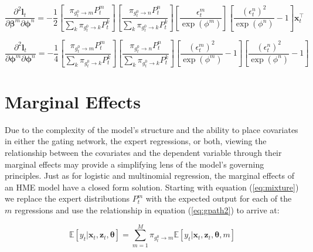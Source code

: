 \documentclass[12pt]{article}
\newcommand{\gateprod}[2]{\pi_{#1 \longrightarrow #2}}
\theoremstyle{definition}
\begin{document}
\begin{equation} 
  \frac{\partial^{2} \boldsymbol{l}_{t}}{\partial \boldsymbol{\beta}^{m} \partial \boldsymbol{\phi}^{n} } = - \frac{1}{2}  \left[ \frac{\gateprod{g^{0}_{t}}{m} P^{m}_{t}}{ \sum_{k} \gateprod{g^{0}_{t}}{k} P^{k}_{t}} \right] \left[ \frac{\gateprod{g^{0}_{t}}{n} P^{n}_{t}}{ \sum_{k} \gateprod{g^{0}_{t}}{k} P^{k}_{t}} \right]  \left[ \frac{\epsilon^{m}_{t}}{\exp(\phi^{m})} \right] \left[  \frac{ (\epsilon^{n}_{t})^{2} }{\exp(\phi^{n})} - 1 \right] \boldsymbol{x}_{t}^{\top} 
\end{equation}

\begin{equation} 
  \frac{\partial^{2} \boldsymbol{l}_{t}}{\partial \boldsymbol{\phi}^{m} \partial \boldsymbol{\phi}^{n} } =  -\frac{1}{4} \left[ \frac{\gateprod{g^{0}_{t}}{m} P^{m}_{t}}{ \sum_{k} \gateprod{g^{0}_{t}}{k} P^{k}_{t}} \right] \left[ \frac{\gateprod{g^{0}_{t}}{n} P^{n}_{t}}{ \sum_{k} \gateprod{g^{0}_{t}}{k} P^{k}_{t}} \right]  \left[ \frac{ (\epsilon^{m}_{t})^{2} }{\exp(\phi^{m})} - 1 \right] \left[ \frac{ (\epsilon^{n}_{t})^{2} }{\exp(\phi^{n})} - 1 \right] 
\end{equation}


\section{Marginal Effects} \label{sec:MarginalEffects}

Due to the complexity of the model's structure and the ability to 
place covariates in either the gating network, the expert regressions,
or both, viewing the relationship between the covariates and the dependent
variable through their marginal effects may provide a simplifying lens of the 
model's governing principles. Just as for logistic and multinomial regression,
the marginal effects of an HME model have a closed form solution. Starting
with equation (\ref{eq:mixture}) we replace the expert distributions
$P^{m}_{t}$ with the expected output for each of the $m$ regressions and use
the relationship in equation (\ref{eq:gpath2}) to arrive at: 

\begin{equation} \label{eq:mixture2}
  \mathbb{E} \left[ y_{t} | \boldsymbol{x}_{t}, \boldsymbol{z}_{t}, \boldsymbol{\theta} \right] = \sum_{m=1}^{M} \gateprod{g^{0}_{t}}{m} \mathbb{E} \left[ y_{t} | \boldsymbol{x}_{t}, \boldsymbol{z}_{t}, \boldsymbol{\theta}, m \right]
\end{equation}
\end{document}
